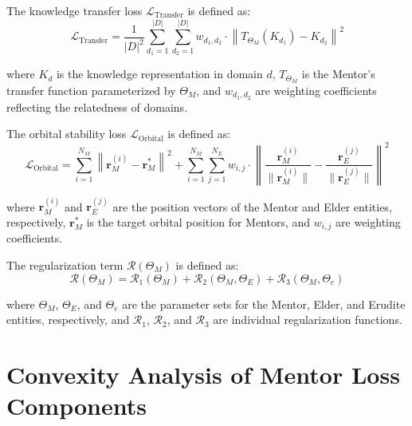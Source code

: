 \begin{definition}
The knowledge transfer loss $\mathcal{L}_{\text{Transfer}}$ is defined as:
\begin{equation}
\mathcal{L}_{\text{Transfer}} = \frac{1}{|D|^2}\sum_{d_1=1}^{|D|} \sum_{d_2=1}^{|D|} w_{d_1,d_2} \cdot \left\|T_{\Theta_M}(K_{d_1}) - K_{d_2}\right\|^2
\end{equation}

where $K_d$ is the knowledge representation in domain $d$, $T_{\Theta_M}$ is the Mentor's transfer function parameterized by $\Theta_M$, and $w_{d_1,d_2}$ are weighting coefficients reflecting the relatedness of domains.
\end{definition}

\begin{definition}
The orbital stability loss $\mathcal{L}_{\text{Orbital}}$ is defined as:
\begin{equation}
\mathcal{L}_{\text{Orbital}} = \sum_{i=1}^{N_M} \left\|\mathbf{r}_M^{(i)} - \mathbf{r}_M^{*}\right\|^2 + \sum_{i=1}^{N_M} \sum_{j=1}^{N_E} w_{i,j} \cdot \left\|\frac{\mathbf{r}_M^{(i)}}{\|\mathbf{r}_M^{(i)}\|} - \frac{\mathbf{r}_E^{(j)}}{\|\mathbf{r}_E^{(j)}\|}\right\|^2
\end{equation}

where $\mathbf{r}_M^{(i)}$ and $\mathbf{r}_E^{(j)}$ are the position vectors of the Mentor and Elder entities, respectively, $\mathbf{r}_M^{*}$ is the target orbital position for Mentors, and $w_{i,j}$ are weighting coefficients.
\end{definition}

\begin{definition}
The regularization term $\mathcal{R}(\Theta_M)$ is defined as:
\begin{equation}
\mathcal{R}(\Theta_M) = \mathcal{R}_1(\Theta_M) + \mathcal{R}_2(\Theta_M, \Theta_E) + \mathcal{R}_3(\Theta_M, \Theta_e)
\end{equation}

where $\Theta_M$, $\Theta_E$, and $\Theta_e$ are the parameter sets for the Mentor, Elder, and Erudite entities, respectively, and $\mathcal{R}_1$, $\mathcal{R}_2$, and $\mathcal{R}_3$ are individual regularization functions.
\end{definition}

\section{Convexity Analysis of Mentor Loss Components}

